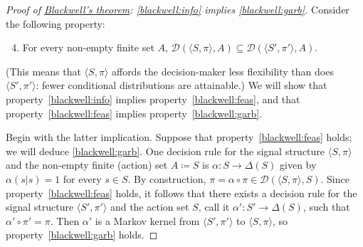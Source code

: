 \begin{proof}[Proof of {\hyperref[theorem:blackwell]{Blackwell's theorem}}: \ref{blackwell:info} implies \ref{blackwell:garb}]
	Consider the following property:
	\begin{enumerate}[label=(\alph*)]

		\setcounter{enumi}{3}
	
		\item \label{blackwell:feas} For every non-empty finite set $A$, $\mathcal{D}(\langle S, \pi \rangle ,A) \subseteq \mathcal{D}(\langle S', \pi' \rangle ,A)$.
	
	\end{enumerate}
	(This means that $\langle S, \pi \rangle $ affords the decision-maker less flexibility than does $\langle S', \pi' \rangle $: fewer conditional distributions are attainable.) We will show that property~\ref{blackwell:info} implies property~\ref{blackwell:feas}, and that property~\ref{blackwell:feas} implies property~\ref{blackwell:garb}.

	Begin with the latter implication. Suppose that property~\ref{blackwell:feas} holds; we will deduce \ref{blackwell:garb}. One decision rule for the signal structure $\langle S, \pi \rangle $ and the non-empty finite (action) set $A \coloneqq S$ is $\alpha : S \to \Delta(S)$ given by $\alpha(s|s)=1$ for every $s \in S$. By construction, $\pi = \alpha \circ \pi \in \mathcal{D}(\langle S, \pi \rangle ,S)$. Since property~\ref{blackwell:feas} holds, it follows that there exists a decision rule for the signal structure $\langle S', \pi' \rangle $ and the action set $S$, call it $\alpha' : S' \to \Delta(S)$, such that $\alpha' \circ \pi' = \pi$. Then $\alpha'$ is a Markov kernel from $\langle S', \pi' \rangle $ to $\langle S, \pi \rangle $, so property~\ref{blackwell:garb} holds.


\end{proof}
